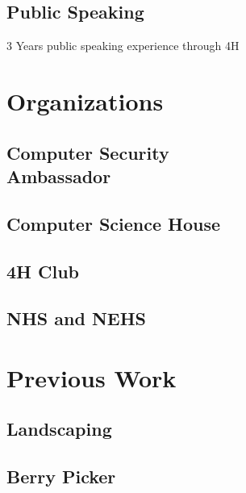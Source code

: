 \documentclass[12pt,letterpaper]{deedy-resume} %
\begin{document}
\begin{minipage}[t]{0.49\textwidth}
\sectionspace

\subsection{Public Speaking}
\sectionspace %
\sectionspace
\begin{tightitemize}
\item 3 Years public speaking experience through 4H 
\end{tightitemize}


\sectionspace %
\sectionspace

\section{Organizations} 

\subsection{Computer Security\\ Ambassador}

\sectionspace %
\sectionspace
\subsection{Computer Science House}

\sectionspace
\sectionspace
\subsection{4H Club}

\sectionspace
\sectionspace
\subsection{NHS and NEHS}

\sectionspace %
\sectionspace

\section{Previous Work}

\subsection{Landscaping}
\sectionspace
\subsection{Berry Picker}

\end{minipage} %
\end{document}
